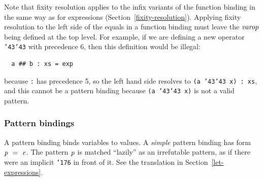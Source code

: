 \begin{haskellprime}

Note that fixity resolution applies to the infix variants of the
function binding in the same way as for expressions
(Section~\ref{fixity-resolution}).  Applying fixity resolution to the
left side of the equals in a function binding must leave the \mbox{$\it varop$}
being defined at the top level.  For example, if we are defining a new
operator \mbox{\tt {\char'43}{\char'43}} with precedence 6, then this definition would be
illegal:
\bprog
{\small\begin{verbatim}
  a ## b : xs = exp
\end{verbatim}}
\eprog
because \mbox{\tt :} has precedence 5, so the left hand side resolves to
\mbox{\tt (a\ {\char'43}{\char'43}\ x)\ :\ xs}, and this cannot be a pattern binding because \mbox{\tt (a\ {\char'43}{\char'43}\ x)}
is not a valid pattern.

\end{haskellprime}


\subsubsection{Pattern bindings}
\label{patbind}

A pattern binding binds variables to values.  A {\em simple} pattern
binding has form \mbox{$\it p\ =\ e$}.
The pattern \mbox{$\it p$} is
matched ``lazily'' as an irrefutable pattern, as if there were an implicit \mbox{\tt {\char'176}} in front 
of it.  See the translation in
Section~\ref{let-expressions}.

